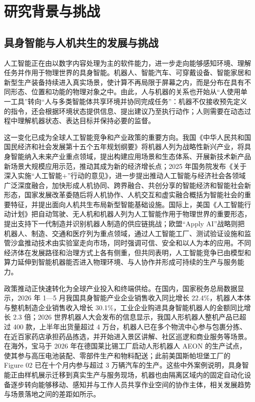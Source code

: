 \chapter{研究背景与挑战}

\section{具身智能与人机共生的发展与挑战}
人工智能正在由以数字内容处理为主的软件能力，进一步走向能够感知环境、理解任务并作用于物理世界的具身智能。机器人、智能汽车、可穿戴设备、智能家居和新型生产装备持续进入真实场景，使计算不再局限于屏幕之内，而是分布在具有不同形态、位置和功能的物理对象之中。由此，人与机器的关系也开始从“人使用单一工具”转向“人与多类智能体共享环境并协同完成任务”：机器不仅接收预先定义的指令，还会根据环境状态提供信息、提出建议乃至执行动作；人则需要在动态过程中理解机器状态、表达目标并保持必要的监督。

这一变化已成为全球人工智能竞争和产业政策的重要方向。我国《中华人民共和国国民经济和社会发展第十五个五年规划纲要》将机器人列为战略性新兴产业，将具身智能纳入未来产业重点领域，提出构建应用场景和生态体系、开展新技术新产品新场景大规模应用示范，推动其成为新的经济增长点\supercite{fifteenth_five_year_plan_2026}；2025 年国务院发布《关于深入实施“人工智能+”行动的意见》，进一步提出推动人工智能与经济社会各领域广泛深度融合，加快形成人机协同、跨界融合、共创分享的智能经济和智能社会新形态\supercite{ai_plus_2025}，国家发展改革委随后将人机协作、人机交互和虚实融合概括为智能社会的重要特征，并提出面向人机共生布局新型智能基础设施\supercite{ndrc_symbiosis_2025}。国际上，美国《人工智能行动计划》把自动驾驶、无人机和机器人列为人工智能作用于物理世界的重要形态，提出支持下一代制造并识别机器人制造的供应链挑战\supercite{us_ai_action_plan_2025}；欧盟“Apply AI”战略则把机器人、制造、交通和医疗列为重点领域，通过人工智能工厂、测试验证设施和监管沙盒推动技术由实验室走向市场，同时强调可信、安全和以人为本的应用\supercite{eu_apply_ai_2025}。不同经济体在发展路径和治理方式上各有侧重，但共同表明，人工智能竞争已由模型和算力延伸到智能机器能否进入物理环境、与人协作并形成可持续的生产与服务能力。

政策推动正快速转化为全球产业投入和终端供给。在国内，国家税务总局数据显示，2026 年 1---5 月我国具身智能产业企业销售收入同比增长 22.4\%，机器人本体与整机制造企业销售收入增长 30.1\%，工业企业购进具身智能机器人的金额同比增长 2.3 倍\supercite{china_embodied_tax_2026}；2026 世界机器人大会发布的信息显示，我国人形机器人整机产品已超过 400 款，上半年出货量超过 4 万台，机器人已在多个物流中心参与包裹分拣、在近百家药店承担药品拣选，并开始进入景区讲解、社区巡逻和商业服务等场景\supercite{xinhua_embodied_2026}。在海外，宝马于 2026 年在德国莱比锡工厂启动人形机器人 AEON 的生产试点，使其参与高压电池装配、零部件生产和物料配送；此前美国斯帕坦堡工厂的 Figure 02 已在十个月内参与超过 3 万辆汽车的生产\supercite{bmw_humanoid_2026}。这些中外案例说明，具身智能正由样机展示迁移到真实生产与服务现场，机器也由隔离区域内的固定自动化设备逐步转向能够移动、感知并与工作人员共享作业空间的协作主体，相关发展趋势与场景落地之间的差距如所示。

